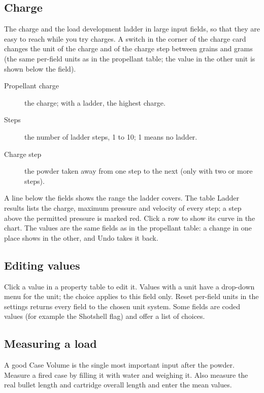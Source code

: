 \documentclass[11pt,a4paper]{article}
\newcommand{\ui}[1]{\textsf{#1}}
\begin{document}
\subsection{Charge}
The charge and the load development ladder in large input fields, so that they are easy to reach while you try charges. A switch in the corner of the charge card changes the unit of the charge and of the charge step between grains and grams (the same per-field units as in the propellant table; the value in the other unit is shown below the field).
\begin{description}
  \item[Propellant charge] the charge; with a ladder, the highest charge.
  \item[Steps] the number of ladder steps, 1 to 10; 1 means no ladder.
  \item[Charge step] the powder taken away from one step to the next (only with two or more steps).
\end{description}
A line below the fields shows the range the ladder covers. The table \ui{Ladder results} lists the charge, maximum pressure and velocity of every step; a step above the permitted pressure is marked red. Click a row to show its curve in the chart. The values are the same fields as in the propellant table: a change in one place shows in the other, and \ui{Undo} takes it back.

\subsection{Editing values}
Click a value in a property table to edit it. Values with a unit have a drop-down menu for the unit; the choice applies to this field only.
\ui{Reset per-field units} in the settings returns every field to the chosen unit system. Some fields are coded values (for example the
\ui{Shotshell} flag) and offer a list of choices.

\subsection{Measuring a load}
A good \ui{Case Volume} is the single most important input after the powder. Measure a fired case by filling it with water and weighing it.
Also measure the real bullet length and cartridge overall length and enter the mean values.
\end{document}
